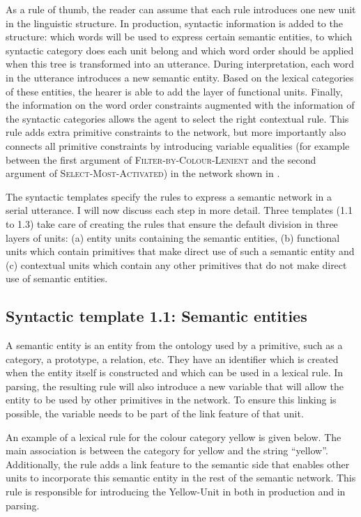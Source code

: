 As a rule of thumb, the reader can assume that each rule introduces
one new unit in the linguistic structure. In production, syntactic
information is added to the structure: which words will be used to
express certain semantic entities, to which syntactic category does
each unit belong and which word order should be applied when this tree
is transformed into an utterance. During interpretation, each word in
the utterance introduces a new semantic entity. Based on the lexical
categories of these entities, the hearer is able to add the layer of
functional units. Finally, the information on the word order
constraints augmented with the information of the syntactic categories
allows the agent to select the right contextual rule. This rule adds
extra primitive constraints to the network, but more importantly also
connects all primitive constraints by introducing variable equalities
(for example between the first argument of
\textsc{Filter-by-Colour-Lenient} and the second argument of
\textsc{Select-Most-Activated}) in the network shown in .

The syntactic templates specify the rules to express a semantic
network in a serial utterance. I will now discuss each step in more
detail. Three templates (1.1 to 1.3) take care of creating the rules
that ensure the default division in three layers of units: (a) entity
units containing the semantic entities, (b) functional units which
contain primitives that make direct use of such a semantic entity and
(c) contextual units which contain any other primitives that do not
make direct use of semantic entities.

\subsection{Syntactic template 1.1: Semantic entities}

A semantic entity is an entity from the ontology used by a primitive,
such as a category, a prototype, a relation, etc. They have an
identifier which is created when the entity itself is constructed and
which can be used in a lexical rule. In parsing, the resulting rule
will also introduce a new variable that will allow the entity to be
used by other primitives in the network. To ensure this linking is
possible, the variable needs to be part of the link feature of that
unit.

An example of a lexical rule for the colour category yellow is given
below. The main association is between the category for yellow and the
string ``yellow''. Additionally, the rule adds a link feature to the
semantic side that enables other units to incorporate this semantic
entity in the rest of the semantic network. This rule is responsible
for introducing the Yellow-Unit in  both in production and in parsing.

